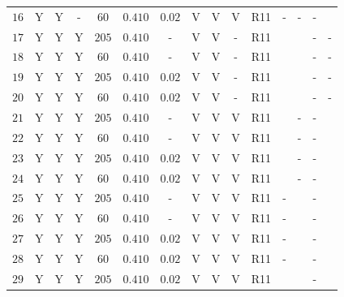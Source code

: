 \begin{center}
\begin{longtable}{@{\extracolsep{\fill}}ccccccccccccccc@{}}
\rule[-1ex]{0pt}{2.5ex} $16$ & Y & Y & - & $60$ & $0.410$ & $0.02$ & V & V & V & R11 & - & - & - & \cite{vanLeeuwen:2007xw} \\
\rule[-1ex]{0pt}{2.5ex} $17$ & Y & Y & Y & $205$ & $0.410$ & - & V & V & - & R11 & \cite{Humphreys:2013eja} & \cite{Pietrzynski:2013gia} & - & - \\
\rule[-1ex]{0pt}{2.5ex} $18$ & Y & Y & Y & $60$ & $0.410$ & - & V & V & - & R11 & \cite{Humphreys:2013eja} & \cite{Pietrzynski:2013gia} & - & - \\
\rule[-1ex]{0pt}{2.5ex} $19$ & Y & Y & Y & $205$ & $0.410$ & $0.02$ & V & V & - & R11 & \cite{Humphreys:2013eja} & \cite{Pietrzynski:2013gia} & - & - \\
\rule[-1ex]{0pt}{2.5ex} $20$ & Y & Y & Y & $60$ & $0.410$ & $0.02$ & V & V & - & R11 & \cite{Humphreys:2013eja} & \cite{Pietrzynski:2013gia} & - & - \\ 
\rule[-1ex]{0pt}{2.5ex} $21$ & Y & Y & Y & $205$ & $0.410$ & - & V & V & V & R11 & \cite{Humphreys:2013eja} & - & - & \cite{vanLeeuwen:2007xw} \\ 
\rule[-1ex]{0pt}{2.5ex} $22$ & Y & Y & Y & $60$ & $0.410$ & - & V & V & V & R11 & \cite{Humphreys:2013eja} & - & - & \cite{vanLeeuwen:2007xw} \\
\rule[-1ex]{0pt}{2.5ex} $23$ & Y & Y & Y & $205$ & $0.410$ & $0.02$ & V & V & V & R11 & \cite{Humphreys:2013eja} & - & - & \cite{vanLeeuwen:2007xw} \\
\rule[-1ex]{0pt}{2.5ex} $24$ & Y & Y & Y & $60$ & $0.410$ & $0.02$ & V & V & V & R11 & \cite{Humphreys:2013eja} & - & - & \cite{vanLeeuwen:2007xw} \\
\rule[-1ex]{0pt}{2.5ex} $25$ & Y & Y & Y & $205$ & $0.410$ & - & V & V & V & R11 & - & \cite{Pietrzynski:2013gia} & - & \cite{vanLeeuwen:2007xw} \\ 
\rule[-1ex]{0pt}{2.5ex} $26$ & Y & Y & Y & $60$ & $0.410$ & - & V & V & V & R11 & - & \cite{Pietrzynski:2013gia} & - & \cite{vanLeeuwen:2007xw} \\
\rule[-1ex]{0pt}{2.5ex} $27$ & Y & Y & Y & $205$ & $0.410$ & $0.02$ & V & V & V & R11 & - & \cite{Pietrzynski:2013gia} & - & \cite{vanLeeuwen:2007xw} \\
\rule[-1ex]{0pt}{2.5ex} $28$ & Y & Y & Y & $60$ & $0.410$ & $0.02$ & V & V & V & R11 & - & \cite{Pietrzynski:2013gia} & - & \cite{vanLeeuwen:2007xw} \\
\rule[-1ex]{0pt}{2.5ex} $29$ & Y & Y & Y & $205$ & $0.410$ & $0.02$ & V & V & V & R11 & \cite{Humphreys:2013eja} & \cite{Pietrzynski:2013gia} & - & \cite{vanLeeuwen:2007xw} \\ 

\end{longtable}
\end{center}

